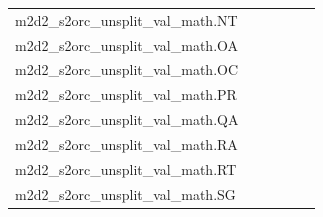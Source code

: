 \documentclass[dvipsnames]{article}
\begin{document}
\begin{appendix}
{\begin{longtable}{m{6cm}m{1.7cm}m{1.7cm}m{1.7cm}m{1.7cm}m{1.7cm}}
	m2d2\_s2orc\_unsplit\_val\_math.NT  & \colorbox[HTML]{77c578}{\makebox[\mywidth][c]{8.26}} & \colorbox[HTML]{e1f3a9}{\makebox[\mywidth][c]{8.51}} & \colorbox[HTML]{ffffe5}{\makebox[\mywidth][c]{9.92}} & \colorbox[HTML]{ccea9c}{\makebox[\mywidth][c]{8.43}} & \colorbox[HTML]{9ad486}{\makebox[\mywidth][c]{8.31}}\\
	m2d2\_s2orc\_unsplit\_val\_math.OA  & \colorbox[HTML]{77c578}{\makebox[\mywidth][c]{7.21}} & \colorbox[HTML]{e9f6af}{\makebox[\mywidth][c]{7.55}} & \colorbox[HTML]{ffffe5}{\makebox[\mywidth][c]{9.07}} & \colorbox[HTML]{ddf1a6}{\makebox[\mywidth][c]{7.47}} & \colorbox[HTML]{b2df90}{\makebox[\mywidth][c]{7.32}}\\
	m2d2\_s2orc\_unsplit\_val\_math.OC  & \colorbox[HTML]{7fc97b}{\makebox[\mywidth][c]{9.70}} & \colorbox[HTML]{e4f4ab}{\makebox[\mywidth][c]{10.01}} & \colorbox[HTML]{ffffe5}{\makebox[\mywidth][c]{11.62}} & \colorbox[HTML]{bfe596}{\makebox[\mywidth][c]{9.85}} & \colorbox[HTML]{77c578}{\makebox[\mywidth][c]{9.69}}\\
	m2d2\_s2orc\_unsplit\_val\_math.PR  & \colorbox[HTML]{77c578}{\makebox[\mywidth][c]{8.91}} & \colorbox[HTML]{e7f5ad}{\makebox[\mywidth][c]{9.20}} & \colorbox[HTML]{ffffe5}{\makebox[\mywidth][c]{10.58}} & \colorbox[HTML]{bde395}{\makebox[\mywidth][c]{9.04}} & \colorbox[HTML]{a5d98b}{\makebox[\mywidth][c]{8.99}}\\
	m2d2\_s2orc\_unsplit\_val\_math.QA  & \colorbox[HTML]{77c578}{\makebox[\mywidth][c]{8.09}} & \colorbox[HTML]{e5f5ac}{\makebox[\mywidth][c]{8.40}} & \colorbox[HTML]{ffffe5}{\makebox[\mywidth][c]{9.93}} & \colorbox[HTML]{ccea9c}{\makebox[\mywidth][c]{8.28}} & \colorbox[HTML]{9bd587}{\makebox[\mywidth][c]{8.16}}\\
	m2d2\_s2orc\_unsplit\_val\_math.RA  & \colorbox[HTML]{77c578}{\makebox[\mywidth][c]{7.18}} & \colorbox[HTML]{e5f4ab}{\makebox[\mywidth][c]{7.44}} & \colorbox[HTML]{ffffe5}{\makebox[\mywidth][c]{8.75}} & \colorbox[HTML]{daf0a4}{\makebox[\mywidth][c]{7.39}} & \colorbox[HTML]{addd8e}{\makebox[\mywidth][c]{7.27}}\\
	m2d2\_s2orc\_unsplit\_val\_math.RT  & \colorbox[HTML]{77c578}{\makebox[\mywidth][c]{8.39}} & \colorbox[HTML]{e4f4ab}{\makebox[\mywidth][c]{8.71}} & \colorbox[HTML]{ffffe5}{\makebox[\mywidth][c]{10.33}} & \colorbox[HTML]{d9f0a3}{\makebox[\mywidth][c]{8.65}} & \colorbox[HTML]{a7da8b}{\makebox[\mywidth][c]{8.49}}\\
	m2d2\_s2orc\_unsplit\_val\_math.SG  & \colorbox[HTML]{8bce80}{\makebox[\mywidth][c]{8.63}} & \colorbox[HTML]{e4f4ab}{\makebox[\mywidth][c]{8.88}} & \colorbox[HTML]{ffffe5}{\makebox[\mywidth][c]{10.36}} & \colorbox[HTML]{c8e89a}{\makebox[\mywidth][c]{8.76}} & \colorbox[HTML]{77c578}{\makebox[\mywidth][c]{8.59}}\\

\end{longtable}}
\end{appendix}
\end{document}
